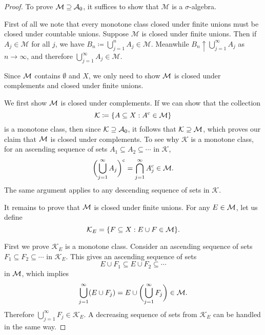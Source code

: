 \begin{proof}
To prove $\mathcal{M}\supseteq\mathcal{A}_0$, it suffices to show that $\mathcal{M}$ is a $\sigma$-algebra.

First of all we note that every monotone class closed under finite unions must be closed under countable unions. Suppose $\mathcal{M}$ is closed under finite unions. Then if $A_{j}\in\mathcal{M}$ for all $j$, we have $B_{n}\coloneqq\bigcup_{j=1}^{n}A_{j}\in\mathcal{M}$. Meanwhile $B_{n}\uparrow\bigcup_{j=1}^{\infty}A_{j}$ as $n\to\infty$, and therefore $\bigcup_{j=1}^{\infty}A_{j}\in\mathcal{M}$.

Since $\mathcal{M}$ contains $\emptyset$ and $X$, we only need to show $\mathcal{M}$
is closed under complements and closed under finite unions.

{We first show $\mathcal{M}$ is closed under complements.} If we can show that the collection \[\mathcal K \coloneqq \{A\subseteq X:A^{\mathrm{c}}\in\mathcal{M}\}\] is a monotone class, then since $\mathcal K\supseteq\mathcal{A}_0$, it follows that $\mathcal{K}\supseteq\mathcal{M}$, which proves our claim that $\mathcal{M}$ is closed under complements. To see why $\mathcal K$ is a monotone class, for an ascending sequence of sets $A_{1}\subseteq A_{2}\subseteq\cdots$ in $\mathcal K$, \[\biggl(\bigcup_{j=1}^{\infty}A_{j}\biggr)^{\mathrm{c}}=\bigcap_{j=1}^{\infty}A_{j}^{\mathrm{c}}\in\mathcal{M}.\] The same argument applies to any descending sequence of sets in $\mathcal K$.


{It remains to prove that $\mathcal{M}$ is closed under finite
unions.} For any $E\in\mathcal{M}$, let us define 
\[
\mathcal K_{E}=\{F\subseteq X:E\cup F\in\mathcal{M}\}.
\]

First we prove $\mathcal K_{E}$ is a monotone class. Consider an
ascending sequence of sets $F_{1}\subseteq F_{2}\subseteq\cdots$
in $\mathcal K_{E}$. This gives an ascending sequence of sets 
\[
    E\cup F_{1}\subseteq E\cup F_{2}\subseteq\cdots
\]
in $\mathcal{M}$, which implies \[\bigcup_{j=1}^{\infty}(E\cup F_{j})=E\cup\biggl(\bigcup_{j=1}^{\infty}F_{j}\biggr)\in\mathcal{M}.\] Therefore $\bigcup_{j=1}^{\infty}F_{j}\in\mathcal K_E$. A decreasing sequence of sets from $\mathcal K_{E}$ can be handled in the same way.


\end{proof}
